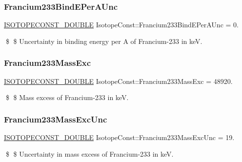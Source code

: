 \subsubsection{\texorpdfstring{Francium233\+Bind\+E\+Per\+A\+Unc}{Francium233BindEPerAUnc}}
{\footnotesize\ttfamily \mbox{\hyperlink{group___isotope_const-_macros_ga8f45a7272ce02c0b4c65c44636ed719a}{I\+S\+O\+T\+O\+P\+E\+C\+O\+N\+S\+T\+\_\+\+D\+O\+U\+B\+LE}} Isotope\+Const\+::\+Francium233\+Bind\+E\+Per\+A\+Unc = 0.}

\$ \$ Uncertainty in binding energy per A of Francium-\/233 in keV. \mbox{\label{group___isotope_const-_francium-_fr233_ga9eff3a319ebbb4fbe3448a80d7d2991b}} 
\subsubsection{\texorpdfstring{Francium233\+Mass\+Exc}{Francium233MassExc}}
{\footnotesize\ttfamily \mbox{\hyperlink{group___isotope_const-_macros_ga8f45a7272ce02c0b4c65c44636ed719a}{I\+S\+O\+T\+O\+P\+E\+C\+O\+N\+S\+T\+\_\+\+D\+O\+U\+B\+LE}} Isotope\+Const\+::\+Francium233\+Mass\+Exc = 48920.}

\$ \$ Mass excess of Francium-\/233 in keV. \mbox{\label{group___isotope_const-_francium-_fr233_ga45047c8a0cbf113b1892d80ce7a415e9}} 
\subsubsection{\texorpdfstring{Francium233\+Mass\+Exc\+Unc}{Francium233MassExcUnc}}
{\footnotesize\ttfamily \mbox{\hyperlink{group___isotope_const-_macros_ga8f45a7272ce02c0b4c65c44636ed719a}{I\+S\+O\+T\+O\+P\+E\+C\+O\+N\+S\+T\+\_\+\+D\+O\+U\+B\+LE}} Isotope\+Const\+::\+Francium233\+Mass\+Exc\+Unc = 19.}

\$ \$ Uncertainty in mass excess of Francium-\/233 in keV. \mbox{\label{group___isotope_const-_francium-_fr233_gaade30af66d1f792d5bd3621e39f527e2}} 
